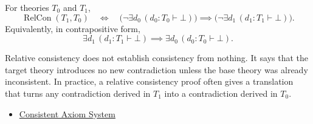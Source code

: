 \begin{remark*}
For theories $T_0$ and $T_1$,
\[
  \operatorname{RelCon}(T_1,T_0)
  \quad\Longleftrightarrow\quad
  \bigl(\neg\exists d_0\,(d_0:T_0\vdash\bot)\bigr)
  \implies
  \bigl(\neg\exists d_1\,(d_1:T_1\vdash\bot)\bigr).
\]
Equivalently, in contrapositive form,
\[
  \exists d_1\,(d_1:T_1\vdash\bot)
  \implies
  \exists d_0\,(d_0:T_0\vdash\bot).
\]
\end{remark*}

\begin{remark*}[Interpretation]
Relative consistency does not establish consistency from nothing. It says that
the target theory introduces no new contradiction unless the base theory was
already inconsistent. In practice, a relative consistency proof often gives a
translation that turns any contradiction derived in $T_1$ into a contradiction
derived in $T_0$.
\end{remark*}

\begin{dependencies}
\begin{itemize}
  \item \hyperref[def:axiom-systems-consistent-axiom-system]{Consistent Axiom System}
\end{itemize}
\end{dependencies}
